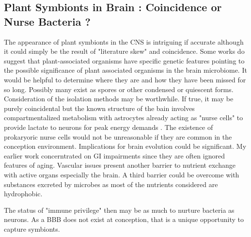 \documentclass[aps,secnumarabic,balancelastpage,amsmath,amssymb,nofootinbib]{revtex4}
\begin{document}
\subsection{ Plant Symbionts in Brain : Coincidence or Nurse Bacteria ?  }


The appearance of plant symbionts in the CNS is
intriguing if accurate although it could simply
be the result of "literature skew" and coincidence.
Some works do suggest that plant-associated organisms have
specific genetic features
\cite{Levy_Gonzalez_Mittelviefhaus_Genomic_features_bacterial_2018} 
pointing to the possible significance of plant associated
organisms in the brain microbiome.
It would be helpful
to determine where they are and how they have been
missed for so long. Possibly many exist as spores or 
other condensed or quiescent forms. Consideration of the
isolation methods may be worthwhile. If true, it may 
be purely coincidental but the known structure of the bain
involves compartmentalized metabolism with astrocytes
already acting as "nurse cells" to provide lactate
to neurons for peak energy demands
\cite{PMID12742077}. The existence of prokaryoric nurse
cells would not be unreasonable if they are common in 
the conception environment. Implications for brain
evolution could be significant.  
My earlier work concerntrated on GI impairments since
they are often ignored features of aging. Vascular
issues present another barrier to nutrient exchange with
active organs especially the brain. A third barrier could
be overcome with substances excreted by microbes as
most of the nutrients considered are hydrophobic.  

The status of "immune privilege" \cite{Proulx_Engelhardt_Central_nervous_system_zoning_2022}
 then may be as much
to nurture bacteria as neurons.  As a BBB  does not exist at conception,
that is a unique opportunity to capture symbionts. 
\end{document}
